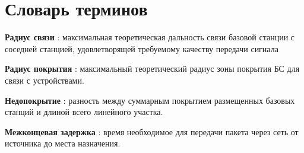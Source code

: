 \chapter*{Словарь терминов}             %


\textbf{Радиус связи} : максимальная теоретическая дальность связи базовой станции с соседней станцией, удовлетворящей требуемому качеству передачи сигнала

\textbf{Радиус покрытия} : максимальный теоретический радиус зоны покрытия БС для связи с устройствами.

\textbf{Недопокрытие} : разность между суммарным покрытием размещенных базовых станций и длиной всего линейного участка.

\textbf{Межконцевая задержка} : время необходимое для передачи пакета через сеть от источника до места назначения.
